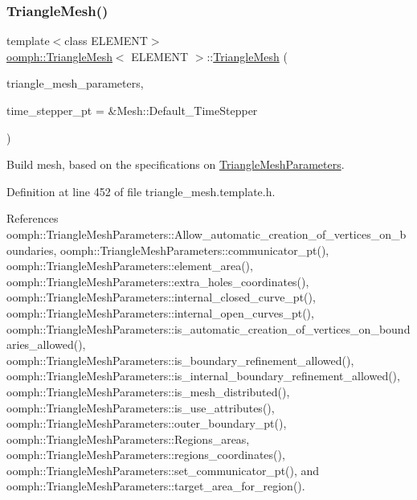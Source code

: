 \subsubsection{\texorpdfstring{Triangle\+Mesh()}{TriangleMesh()}\hspace{0.1cm}{\footnotesize\ttfamily [3/5]}}
{\footnotesize\ttfamily template$<$class E\+L\+E\+M\+E\+NT$>$ \\
\hyperlink{classoomph_1_1TriangleMesh}{oomph\+::\+Triangle\+Mesh}$<$ E\+L\+E\+M\+E\+NT $>$\+::\hyperlink{classoomph_1_1TriangleMesh}{Triangle\+Mesh} (\begin{DoxyParamCaption}\item[{\hyperlink{classoomph_1_1TriangleMeshParameters}{Triangle\+Mesh\+Parameters} \&}]{triangle\+\_\+mesh\+\_\+parameters,  }\item[{Time\+Stepper $\ast$}]{time\+\_\+stepper\+\_\+pt = {\ttfamily \&Mesh\+:\+:Default\+\_\+TimeStepper} }\end{DoxyParamCaption})\hspace{0.3cm}{\ttfamily [inline]}}



Build mesh, based on the specifications on \hyperlink{classoomph_1_1TriangleMeshParameters}{Triangle\+Mesh\+Parameters}. 



Definition at line 452 of file triangle\+\_\+mesh.\+template.\+h.



References oomph\+::\+Triangle\+Mesh\+Parameters\+::\+Allow\+\_\+automatic\+\_\+creation\+\_\+of\+\_\+vertices\+\_\+on\+\_\+boundaries, oomph\+::\+Triangle\+Mesh\+Parameters\+::communicator\+\_\+pt(), oomph\+::\+Triangle\+Mesh\+Parameters\+::element\+\_\+area(), oomph\+::\+Triangle\+Mesh\+Parameters\+::extra\+\_\+holes\+\_\+coordinates(), oomph\+::\+Triangle\+Mesh\+Parameters\+::internal\+\_\+closed\+\_\+curve\+\_\+pt(), oomph\+::\+Triangle\+Mesh\+Parameters\+::internal\+\_\+open\+\_\+curves\+\_\+pt(), oomph\+::\+Triangle\+Mesh\+Parameters\+::is\+\_\+automatic\+\_\+creation\+\_\+of\+\_\+vertices\+\_\+on\+\_\+boundaries\+\_\+allowed(), oomph\+::\+Triangle\+Mesh\+Parameters\+::is\+\_\+boundary\+\_\+refinement\+\_\+allowed(), oomph\+::\+Triangle\+Mesh\+Parameters\+::is\+\_\+internal\+\_\+boundary\+\_\+refinement\+\_\+allowed(), oomph\+::\+Triangle\+Mesh\+Parameters\+::is\+\_\+mesh\+\_\+distributed(), oomph\+::\+Triangle\+Mesh\+Parameters\+::is\+\_\+use\+\_\+attributes(), oomph\+::\+Triangle\+Mesh\+Parameters\+::outer\+\_\+boundary\+\_\+pt(), oomph\+::\+Triangle\+Mesh\+Parameters\+::\+Regions\+\_\+areas, oomph\+::\+Triangle\+Mesh\+Parameters\+::regions\+\_\+coordinates(), oomph\+::\+Triangle\+Mesh\+Parameters\+::set\+\_\+communicator\+\_\+pt(), and oomph\+::\+Triangle\+Mesh\+Parameters\+::target\+\_\+area\+\_\+for\+\_\+region().

